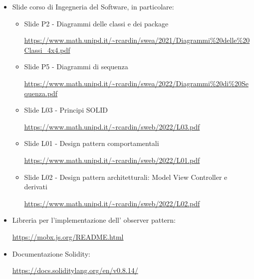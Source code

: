 \begin{itemize}
    \item Slide corso di Ingegneria del Software, in particolare:
    \begin{itemize}
        \item Slide P2 - Diagrammi delle classi e dei package
        \begin{center}
            \url{https://www.math.unipd.it/~rcardin/swea/2021/Diagrammi%20delle%20Classi_4x4.pdf}
        \end{center}
        \item Slide P5 - Diagrammi di sequenza
        \begin{center}
            \url{https://www.math.unipd.it/~rcardin/swea/2022/Diagrammi%20di%20Sequenza.pdf}
        \end{center}
        \item Slide L03 - Principi SOLID
        \begin{center}
            \url{https://www.math.unipd.it/~rcardin/sweb/2022/L03.pdf}
        \end{center}
        \item Slide L01 - Design pattern comportamentali
        \begin{center}
            \url{https://www.math.unipd.it/~rcardin/sweb/2022/L01.pdf}
        \end{center}
        \item Slide L02 - Design pattern architetturali: Model View Controller e derivati
        \begin{center}
            \url{https://www.math.unipd.it/~rcardin/sweb/2022/L02.pdf}
        \end{center}    
    \end{itemize}
    \item Libreria per l'implementazione dell' observer pattern:
    \begin{center}
        \url{https://mobx.js.org/README.html}
    \end{center}
    \item Documentazione Solidity:
    \begin{center}
        \url{https://docs.soliditylang.org/en/v0.8.14/}
    \end{center}
\end{itemize}    